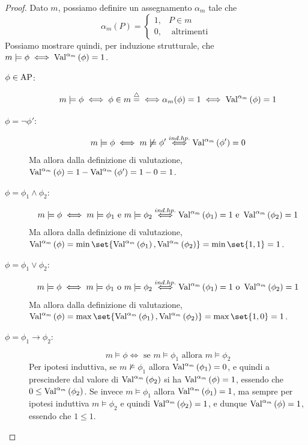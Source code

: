 \begin{proof}
  Dato \(m\), possiamo definire un assegnamento \(\alpha_{m}\) tale che
  \[\alpha_{m}(P) = \begin{cases}
    1, & P \in m\\
    0, & \text{ altrimenti}
  \end{cases}\]
  Possiamo mostrare quindi, per induzione strutturale, che \(m\models \phi \iff \Val{\alpha_m}[\phi] = 1\).
  \begin{description}
    \item[\(\phi \in \AP\):]
      \[m \models \phi \iff \phi \in m \eqdef {\iff}\alpha_m(\phi) = 1 \iff \Val{\alpha_m}[\phi] = 1\]
    \item[\(\phi = \neg \phi'\):]
      \[m \models \phi \iff m \not\models \phi' \stackrel{ind. hp.}{\iff} \Val{\alpha_m}[\phi'] = 0\]
      Ma allora dalla definizione di valutazione, \(\Val{\alpha_m}[\phi] = 1-\Val{\alpha_m}[\phi'] = 1-0 = 1\).
    \item[\(\phi = \phi_1 \land \phi_2\):]
      \[m \models \phi \iff m \models \phi_1 \text{ e } m \models \phi_2 \overset{ind. hp.}{\iff} \Val{\alpha_m}[\phi_1] = 1 \text{ e } \Val{\alpha_m}[\phi_2] = 1\]
      Ma allora dalla definizione di valutazione, \(\Val{\alpha_m}[\phi] = \min\set{\Val{\alpha_m}[\phi_1], \Val{\alpha_m}[\phi_2]} = \min\set{1, 1} = 1\).
    \item[\(\phi = \phi_1 \lor \phi_2\):]
      \[m \models \phi \iff m \models \phi_1 \text{ o } m \models \phi_2 \overset{ind. hp.}{\iff} \Val{\alpha_m}[\phi_1] = 1 \text{ o } \Val{\alpha_m}[\phi_2] = 1\]
      Ma allora dalla definizione di valutazione, \(\Val{\alpha_m}[\phi] = \max\set{\Val{\alpha_m}[\phi_1], \Val{\alpha_m}[\phi_2]} = \max\set{1, 0} = 1\).
    \item[\(\phi = \phi_1 \rightarrow \phi_2\):] 
      \[m \models \phi \iff \text{ se } m \models \phi_1 \text{ allora } m \models \phi_2\]
      Per ipotesi induttiva, se \(m \not\models \phi_1\) allora \(\Val{\alpha_m}[\phi_1] = 0\), e quindi a prescindere dal valore di \(\Val{\alpha_m}[\phi_2]\) si ha \(\Val{\alpha_m}[\phi] = 1\), essendo che \(0 \leq \Val{\alpha_m}[\phi_2]\).
      Se invece \(m \models \phi_1\) allora \(\Val{\alpha_m}[\phi_1] = 1\), ma sempre per ipotesi induttiva \(m \models \phi_2\) e quindi \(\Val{\alpha_m}[\phi_2] = 1\), e dunque \(\Val{\alpha_m}[\phi] = 1\), essendo che \(1 \leq 1\).
  \end{description}
\end{proof}

